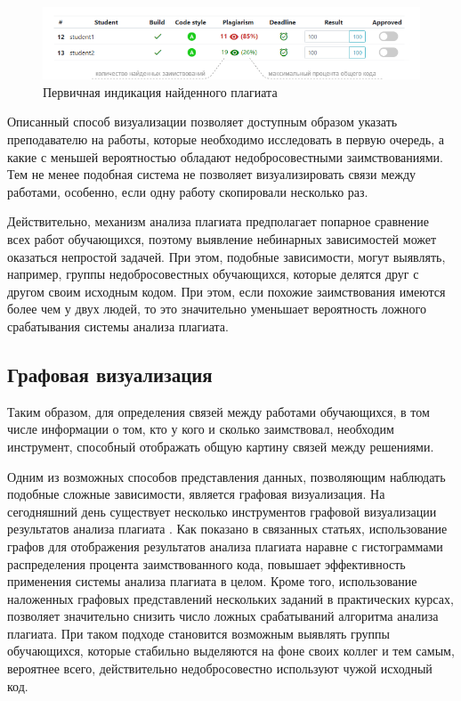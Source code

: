 \documentclass[a4paper,14pt]{extarticle}
\begin{document}
\begin{figure}[h!]
\centering
\includegraphics[width=1.0\textwidth]{plagiarism_indication.png}
\caption{Первичная индикация найденного плагиата}
\label{fig:plagiarismIndication}
\end{figure}

Описанный способ визуализации позволяет доступным образом указать преподавателю на работы, которые необходимо исследовать в первую очередь, а какие с меньшей вероятностью обладают недобросовестными заимствованиями. Тем не менее подобная система не позволяет визуализировать связи между работами, особенно, если одну работу скопировали несколько раз.

Действительно, механизм анализа плагиата предполагает попарное сравнение всех работ обучающихся, поэтому выявление небинарных зависимостей может оказаться непростой задачей. При этом, подобные зависимости, могут выявлять, например, группы недобросовестных обучающихся, которые делятся друг с другом своим исходным кодом. При этом, если похожие заимствования имеются более чем у двух людей, то это значительно уменьшает вероятность ложного срабатывания системы анализа плагиата.

\subsection{Графовая визуализация}

Таким образом, для определения связей между работами обучающихся, в том числе информации о том, кто у кого и сколько заимствовал, необходим инструмент, способный отображать общую картину связей между решениями.

Одним из возможных способов представления данных, позволяющим наблюдать подобные сложные зависимости, является графовая визуализация. На сегодняшний день существует несколько инструментов графовой визуализации результатов анализа плагиата \citep{plagiarismGraph}\citep{graphVisualizationCompetition}. Как показано в связанных статьях, использование графов для отображения результатов анализа плагиата наравне с гистограммами распределения процента заимствованного кода, повышает эффективность применения системы анализа плагиата в целом. Кроме того, использование наложенных графовых представлений нескольких заданий в практических курсах, позволяет значительно снизить число ложных срабатываний алгоритма анализа плагиата. При таком подходе становится возможным выявлять группы обучающихся, которые стабильно выделяются на фоне своих коллег и тем самым, вероятнее всего, действительно недобросовестно используют чужой исходный код.
\end{document}
